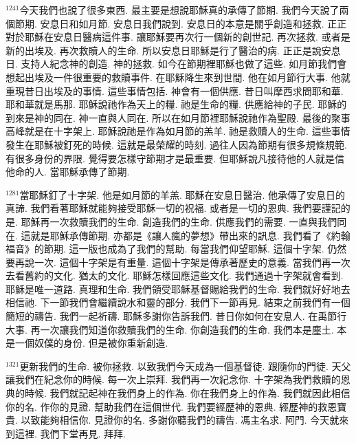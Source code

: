 \documentclass{book}
\begin{document}
$^{1241}$今天我們也說了很多東西.
最主要是想說耶穌真的承傳了節期.
我們今天說了兩個節期.
安息日和如月節.
安息日我們說到.
安息日的本意是關乎創造和拯救.
正正對於耶穌在安息日醫病這件事.
讓耶穌要再次行一個新的創世記.
再次拯救.
或者是新的出埃及.
再次救贖人的生命.
所以安息日耶穌是行了醫治的病.
正正是說安息日.
支持人紀念神的創造.
神的拯救.
如今在節期裡耶穌也做了這些.
如月節我們會想起出埃及一件很重要的救贖事件.
在耶穌降生來到世間.
他在如月節行大事.
他就重現昔日出埃及的事情.
這些事情包括.
神會有一個供應.
昔日叫摩西求問耶和華.
耶和華就是馬那.
耶穌說祂作為天上的糧.
祂是生命的糧.
供應給神的子民.
耶穌的到來是神的同在.
神一直與人同在.
所以在如月節裡耶穌說祂作為聖殿.
最後的聚事高峰就是在十字架上.
耶穌說祂是作為如月節的羔羊.
祂是救贖人的生命.
這些事情發生在耶穌被釘死的時候.
這就是最榮耀的時刻.
過往人因為節期有很多規條規範.
有很多身份的界限.
覺得要怎樣守節期才是最重要.
但耶穌說凡接待他的人就是信他命的人.
當耶穌承傳了節期.

$^{1281}$當耶穌釘了十字架.
他是如月節的羊羔.
耶穌在安息日醫治.
他承傳了安息日的真諦.
我們看著耶穌就能夠接受耶穌一切的祝福.
或者是一切的恩典.
我們要謹記的是.
耶穌再一次救贖我們的生命.
創造我們的生命.
供應我們的需要.
一直與我們同在.
這就是耶穌承傳節期.
亦都是《讓人瘋的夢想》帶出來的訊息.
我們看了《約翰福音》的節期.
這一版也成為了我們的幫助.
每當我們仰望耶穌.
這個十字架.
仍然要再說一次.
這個十字架是有重量.
這個十字架是傳承著歷史的意義.
當我們再一次去看舊約的文化.
猶太的文化.
耶穌怎樣回應這些文化.
我們通過十字架就會看到.
耶穌是唯一道路.
真理和生命.
我們領受耶穌基督賜給我們的生命.
我們就好好地去相信祂.
下一節我們會繼續說水和靈的部分.
我們下一節再見.
結束之前我們有一個簡短的禱告.
我們一起祈禱.
耶穌多謝你告訴我們.
昔日你如何在安息人.
在禹節行大事.
再一次讓我們知道你救贖我們的生命.
你創造我們的生命.
我們本是塵土.
本是一個奴僕的身份.
但是被你重新創造.

$^{1321}$更新我們的生命.
被你拯救.
以致我們今天成為一個基督徒.
跟隨你的門徒.
天父讓我們在紀念你的時候.
每一次上崇拜.
我們再一次紀念你.
十字架為我們救贖的恩典的時候.
我們就記起神在我們身上的作為.
你在我們身上的作為.
我們就因此相信你的名.
作你的見證.
幫助我們在這個世代.
我們要經歷神的恩典.
經歷神的救恩寶貴.
以致能夠相信你.
見證你的名.
多謝你聽我們的禱告.
馮主名求.
阿門.
今天就來到這裡.
我們下堂再見.
拜拜.
\newpage
\end{document}
